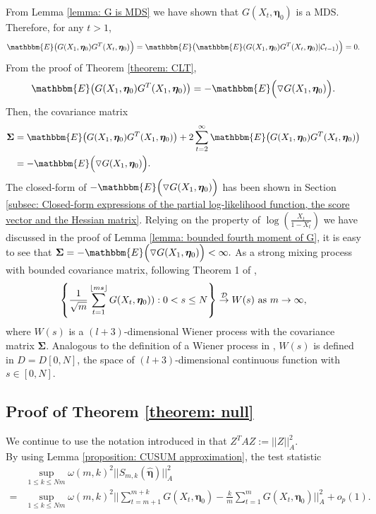 \documentclass{article}
\DeclarePairedDelimiter\floor{\lfloor}{\rfloor}
\theoremstyle{definition}
\begin{document}
From Lemma \ref{lemma: G is MDS} we have shown that $G(X_t,\bm{\eta}_0)$ is a MDS. Therefore, for any $t>1$, $$\mathbbm{E} \big (G(X_1,\bm{\eta}_0)G^T(X_t,\bm{\eta}_0)\Big) = \mathbbm{E} \big(\mathbbm{E}(G(X_1,\bm{\eta}_0)G^T(X_t,\bm{\eta}_0)|\mathcal{C}_{t-1})\Big) = 0.$$ 
From the proof of Theorem \ref{theorem: CLT}, 
\begin{equation*}
    \mathbbm{E}\big(G(X_1,\bm{\eta}_0)G^T(X_1,\bm{\eta}_0)\big) = -\mathbbm{E}\Big(\triangledown G(X_1,\bm{\eta}_0)\Big).
\end{equation*}
Then, the covariance matrix
\begin{equation*}
\begin{aligned}
 \bm{\Sigma} &= \mathbbm{E}\big(G(X_1,\bm{\eta}_0)G^T(X_1,\bm{\eta}_0)\big)+2\sum_{t=2}^{\infty}\mathbbm{E} \big(G(X_1,\bm{\eta}_0)G^T(X_t,\bm{\eta}_0) \big)\\
 &=-\mathbbm{E}\Big(\triangledown G(X_1,\bm{\eta}_0)\Big). 
\end{aligned}
\end{equation*}
The closed-form of $-\mathbbm{E}\Big(\triangledown G(X_1,\bm{\eta}_0)\Big)$ has been shown in Section \ref{subsec: Closed-form expressions of the partial log-likelihood function, the score vector and the Hessian matrix}. Relying on the property of $\log(\frac{X_t}{1-X_t})$ we have discussed in the proof of Lemma \ref{lemma: bounded fourth moment of G}, it is easy to see that $\bm{\Sigma} = -\mathbbm{E}\Big(\triangledown G(X_1,\bm{\eta}_0)\Big) <\infty.$
As a strong mixing process with bounded covariance matrix, following Theorem 1 of \cite{oodaira1972functional}, 
\begin{equation*}
    \left\{\frac{1}{\sqrt{m}}\sum_{t=1}^{\floor{ms}}G(X_t,\bm{\eta}_0)):0< s\leq N \right\} \overset{\mathcal{D}}{\rightarrow}W(s) \text{ as }m \rightarrow \infty,
\end{equation*}
where $W(s)$ is a $(l+3)$-dimensional Wiener process with the covariance matrix $\bm{\Sigma}$. Analogous to the definition of a Wiener process in \cite{oodaira1972functional}, $W(s)$ is defined in $D = D[0,N]$, the space of $(l+3)$-dimensional continuous function with $s \in [0,N].$

\subsection{Proof of Theorem \ref{theorem: null}}
\label{app: proof of the null}
We continue to use the notation introduced in \cite{kirch2015use} that $Z^TAZ:=||Z||^2_A$. \\
By using Lemma \ref{proposition: CUSUM approximation}, the test statistic
\begin{equation}
\begin{aligned}
\label{equation: close-end test statistics 1}
        &\underset{1\leq k \leq Nm}{\sup} \omega(m,k)^2 ||S_{m,k}(\hat{\bm{\eta}})||^2_A \\
        =&\underset{1\leq k \leq Nm}{\sup} \omega(m,k)^2
        ||\sum_{t=m+1}^{m+k}G(X_t,\bm{\eta}_0)-\frac{k}{m}\sum_{t=1}^m G(X_t,\bm{\eta}_0)||^2_A+o_p(1).\\
\end{aligned}
\end{equation}
\end{document}

